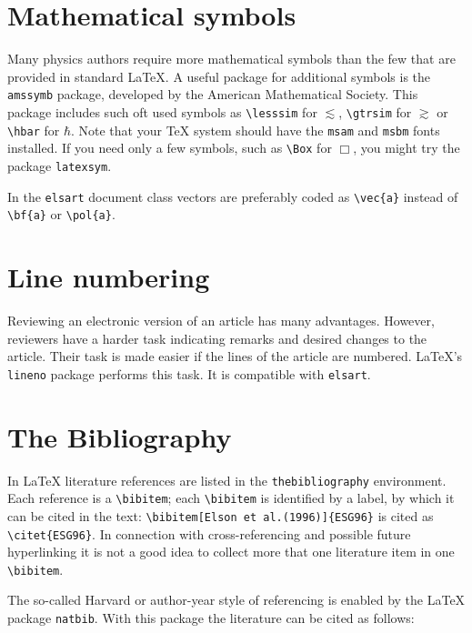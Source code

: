 \documentclass{elsart}
\begin{document}
\section{Mathematical symbols}
\label{symbols}

Many physics authors require more mathematical symbols than the
few that are provided in standard \LaTeX. A useful package for
additional symbols is the \texttt{amssymb} package, developed by the American
Mathematical Society.  This package includes such oft used symbols as
\verb|\lesssim| for $\lesssim$, \verb|\gtrsim| for $\gtrsim$ or
\verb|\hbar| for $\hbar$.  Note that your \TeX{} system should have
the \texttt{msam} and \texttt{msbm} fonts installed.
If you need only a few symbols, such as \verb|\Box| for $\Box$,
you might try the package \texttt{latexsym}.

In the \texttt{elsart} document class vectors are preferably coded as 
\verb|\vec{a}| instead of \verb|\bf{a}| or \verb|\pol{a}|.

\section{Line numbering}
\label{linenumbering}

\begin{linenumbers}
Reviewing an electronic version of an article has many
advantages. However, reviewers have a harder task indicating remarks
and desired changes to the article. Their task is made easier if the
lines of the article are numbered. \LaTeX's \texttt{lineno} package
performs this task. It is compatible with \texttt{elsart}.
\end{linenumbers}

\section{The Bibliography}
\label{thebib}

In \LaTeX{} literature references are listed in the
\verb|thebibliography| environment. Each reference is a
\verb|\bibitem|; each \verb|\bibitem| is identified by a label, by
which it can be cited in the text:
\verb|\bibitem[Elson et al.(1996)]{ESG96}|
is cited as \verb|\citet{ESG96}|. In connection
with cross-referencing and possible future hyperlinking it is not a
good idea to collect more that one literature item in one
\verb|\bibitem|.

The so-called Harvard or author-year style of referencing is enabled by
the \LaTeX{} package \texttt{natbib}. With this package the
literature can be cited as follows:
\end{document}
